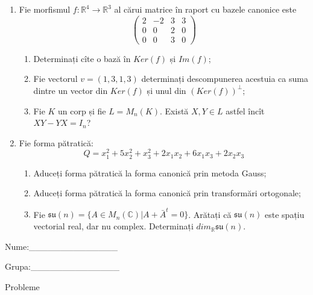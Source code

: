 \documentclass{article}
\begin{document}
\begin{enumerate}
 \item Fie morfismul $f:\mathbb{R}^4 \to \mathbb{R}^3$ al cărui matrice în raport cu bazele canonice este
$$\begin{pmatrix}
2&-2&3&3\\
0&0&2&0\\
0&0&3&0
\end{pmatrix}$$

\begin{enumerate}
\item Determinați cîte o bază în $Ker(f)$ și $Im(f)$;
\item Fie vectorul $v=(1,3,1,3)$ determinați descompunerea acestuia ca suma dintre un vector din $Ker(f)$ și unul din $(Ker(f))^\perp$;
\item Fie $K$ un corp și fie $L=M_n(K)$. Există $X,Y \in L$ astfel încît $XY-YX=I_n$?  
\end{enumerate}
\item Fie forma pătratică:
$$Q= x_1^2+5x_2^2+x_3^2+2x_1x_2+6x_1x_3+2x_2x_3$$

\begin{enumerate}
\item Aduceți forma pătratică la forma canonică prin metoda Gauss;
\item Aduceți forma pătratică la forma canonică prin transformări ortogonale;
\item Fie $\mathfrak{su}(n)=\{ A \in M_n(\mathbb{C}) | A+\bar{A}^t=0\}$. Arătați că $\mathfrak{su}(n)$ este spațiu vectorial real, dar nu complex.
Determinați $dim_{\mathbb{R}}\mathfrak{su}(n)$.
\end{enumerate}
\end{enumerate}
\newpage
\begin{flushright}
Nume:\_\_\_\_\_\_\_\_\_\_\_\_\_\_
 
 
Grupa:\_\_\_\_\_\_\_\_\_\_\_\_\_\_
\end{flushright}
\begin{center}
\vspace{2cm}
{\Large Probleme}
\vspace{2cm}
\end{center}
\end{document}
